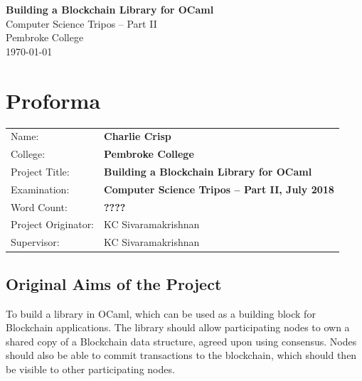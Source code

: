 \documentclass[12pt,a4paper,twoside,openright]{report}
\begin{document}
	
	
	
	
	
	
	\pagestyle{empty}
	
	
	\vspace*{60mm}
	\begin{center}
	\Huge
	\textbf{Building a Blockchain Library for OCaml} \\[5mm]
	Computer Science Tripos -- Part II \\[5mm]
	Pembroke College \\[5mm]
	\today  %
	\end{center}
	
	
	\pagestyle{plain}
	
	\chapter*{Proforma}
	
	{\large
	\begin{tabular}{ll}
	Name:               & \bf Charlie Crisp                       \\
	College:            & \bf Pembroke College                     \\
	Project Title:      & \bf Building a Blockchain Library for OCaml \\
	Examination:        & \bf Computer Science Tripos -- Part II, July 2018  \\
	Word Count:         & \bf ????\footnotemark[1]\\
	Project Originator: & KC Sivaramakrishnan                    \\
	Supervisor:         & KC Sivaramakrishnan                    \\ 
	\end{tabular}
	}
	
	
	\section*{Original Aims of the Project}
	
	To build a library in OCaml, which can be used as a building block for Blockchain applications. 
	The library should allow participating nodes to own a shared copy of a Blockchain data structure, agreed upon using consensus.
	Nodes should also be able to commit transactions to the blockchain, which should then be visible to other participating nodes. 
	
\end{document}
